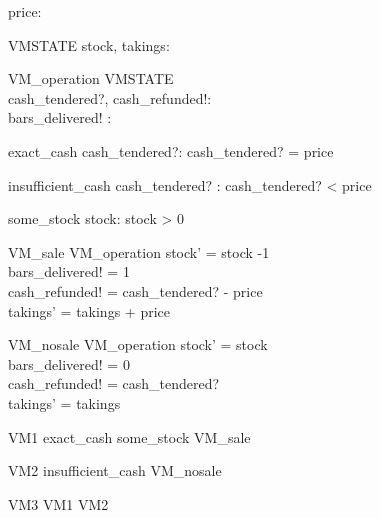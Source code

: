 \documentclass{article}
\begin{document}
\begin{zed}
price:\nat
\end{zed}
\begin{schema}{VMSTATE}
stock, takings: \nat
\end{schema}
\begin{schema}{VM\_operation}
\Delta VMSTATE \\
cash\_tendered?, cash\_refunded!: \nat \\
bars\_delivered! : \nat
\end{schema}
\begin{schema}{exact\_cash}
cash\_tendered?: \nat
\where
cash\_tendered? = price
\end{schema}
\begin{schema}{insufficient\_cash}
cash\_tendered? : \nat
\where
cash\_tendered? < price
\end{schema}
\begin{schema}{some\_stock}
stock: \nat
\where
stock > 0
\end{schema}
\begin{schema}{VM\_sale}
VM\_operation
\where
stock' = stock -1 \\
bars\_delivered! = 1 \\
cash\_refunded! = cash\_tendered? - price \\
takings' = takings + price
\end{schema}
\begin{schema}{VM\_nosale}
VM\_operation
\where
stock' = stock \\
bars\_delivered! = 0 \\
cash\_refunded! = cash\_tendered?\\
takings' = takings
\end{schema}
\begin{zed}
VM1  exact\_cash \land some\_stock \land VM\_sale
\end{zed}
\begin{zed}
VM2  insufficient\_cash \land VM\_nosale
\end{zed}
\begin{zed}
VM3  VM1 \lor VM2
\end{zed}
\end{document}
